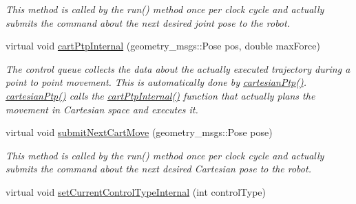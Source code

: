 \begin{DoxyCompactItemize}
\begin{DoxyCompactList}\small\item\em This method is called by the run() method once per clock cycle and actually submits the command about the next desired joint pose to the robot. \end{DoxyCompactList}\item 
\hypertarget{classkukadu_1_1KukieControlQueue_af5ae9a7107d58e35f340f24fcb3785db}{virtual void \hyperlink{classkukadu_1_1KukieControlQueue_af5ae9a7107d58e35f340f24fcb3785db}{cart\-Ptp\-Internal} (geometry\-\_\-msgs\-::\-Pose pos, double max\-Force)}\label{classkukadu_1_1KukieControlQueue_af5ae9a7107d58e35f340f24fcb3785db}

\begin{DoxyCompactList}\small\item\em The control queue collects the data about the actually executed trajectory during a point to point movement. This is automatically done by \hyperlink{classkukadu_1_1ControlQueue_a1bfa23a8ce6319f6ef0ed9208e896054}{cartesian\-Ptp()}. \hyperlink{classkukadu_1_1ControlQueue_a1bfa23a8ce6319f6ef0ed9208e896054}{cartesian\-Ptp()} calls the \hyperlink{classkukadu_1_1KukieControlQueue_af5ae9a7107d58e35f340f24fcb3785db}{cart\-Ptp\-Internal()} function that actually plans the movement in Cartesian space and executes it. \end{DoxyCompactList}\item 
\hypertarget{classkukadu_1_1KukieControlQueue_a7976aea7ef93fe9c96d017309e11e2c1}{virtual void \hyperlink{classkukadu_1_1KukieControlQueue_a7976aea7ef93fe9c96d017309e11e2c1}{submit\-Next\-Cart\-Move} (geometry\-\_\-msgs\-::\-Pose pose)}\label{classkukadu_1_1KukieControlQueue_a7976aea7ef93fe9c96d017309e11e2c1}

\begin{DoxyCompactList}\small\item\em This method is called by the run() method once per clock cycle and actually submits the command about the next desired Cartesian pose to the robot. \end{DoxyCompactList}\item 
\hypertarget{classkukadu_1_1KukieControlQueue_ade8c63d5fad6dedbbd89b1f1a8915191}{virtual void \hyperlink{classkukadu_1_1KukieControlQueue_ade8c63d5fad6dedbbd89b1f1a8915191}{set\-Current\-Control\-Type\-Internal} (int control\-Type)}\label{classkukadu_1_1KukieControlQueue_ade8c63d5fad6dedbbd89b1f1a8915191}


\end{DoxyCompactItemize}
